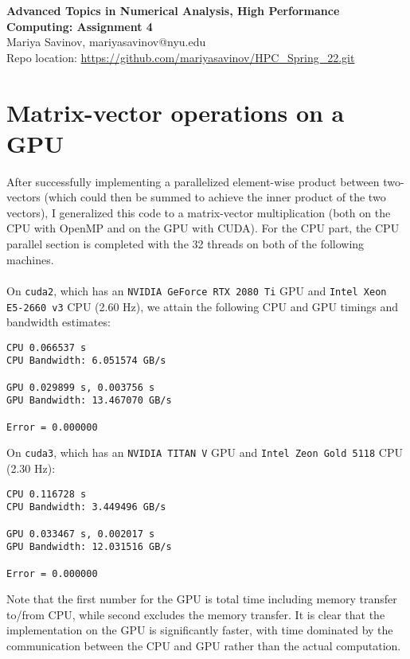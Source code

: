 \documentclass[10pt, letterpaper]{article}
\begin{document}
\begin{center}
{\bf
Advanced Topics in Numerical Analysis, High Performance Computing: \textbf{Assignment 4} \\
}
Mariya Savinov, mariyasavinov@nyu.edu\\
Repo location: \url{https://github.com/mariyasavinov/HPC_Spring_22.git}
\end{center}

\section{Matrix-vector operations on a GPU}
After successfully implementing a parallelized element-wise product between two-vectors (which could then be summed to achieve the inner product of the two vectors), I generalized this code to a matrix-vector multiplication (both on the CPU with OpenMP and on the GPU with CUDA). For the CPU part, the CPU parallel section is completed with the 32 threads on both of the following machines.\\\\
On {\tt cuda2}, which has an {\tt NVIDIA GeForce RTX 2080 Ti} GPU and {\tt Intel Xeon E5-2660 v3} CPU (2.60 Hz), we attain the following CPU and GPU timings and bandwidth estimates:
\begin{verbatim}
CPU 0.066537 s
CPU Bandwidth: 6.051574 GB/s

GPU 0.029899 s, 0.003756 s
GPU Bandwidth: 13.467070 GB/s

Error = 0.000000
\end{verbatim}
On {\tt cuda3}, which has an {\tt NVIDIA TITAN V} GPU and {\tt Intel Zeon Gold 5118} CPU (2.30 Hz):
\begin{verbatim}
CPU 0.116728 s
CPU Bandwidth: 3.449496 GB/s

GPU 0.033467 s, 0.002017 s
GPU Bandwidth: 12.031516 GB/s

Error = 0.000000
\end{verbatim}
Note that the first number for the GPU is total time including memory transfer to/from CPU, while second excludes the memory transfer. It is clear that the implementation on the GPU is significantly faster, with time dominated by the communication between the CPU and GPU rather than the actual computation.

\newpage
\end{document}
